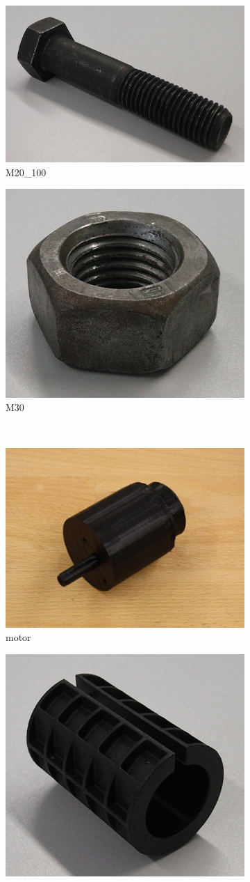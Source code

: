 \begin{figure}[!htb]
\begin{subfigure}{.3\textwidth}
  \centering
  \includegraphics[width=.5\linewidth]{images/M20_100}
  \caption{M20\_100 \cite{github_robocup@work}}
  \label{fig:M20_100}
\end{subfigure}
\begin{subfigure}{.3\textwidth}
  \centering
  \includegraphics[width=.5\linewidth]{images/M30}
  \caption{M30 \cite{github_robocup@work}}
  \label{fig:M30}
\end{subfigure}\\
\vspace{3mm}
\begin{subfigure}{.3\textwidth}
  \centering
  \includegraphics[width=.5\linewidth]{images/motor}
  \caption{motor \cite{github_robocup@work}}
  \label{fig:motor}
\end{subfigure}
\begin{subfigure}{.3\textwidth}
  \centering
  \includegraphics[width=.5\linewidth]{images/R20}

\end{subfigure}
\end{figure}
